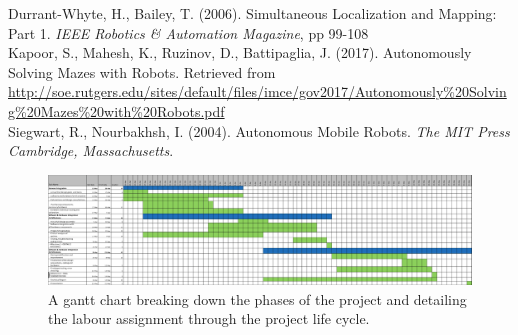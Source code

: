 \documentclass[a4paper]{article}
\begin{document}
Durrant-Whyte, H., Bailey, T. (2006). Simultaneous Localization and Mapping: Part 1. \textit{IEEE Robotics \& Automation Magazine}, pp 99-108\\

Kapoor, S., Mahesh, K., Ruzinov, D., Battipaglia, J. (2017). Autonomously Solving Mazes with Robots. Retrieved from \small\url{http://soe.rutgers.edu/sites/default/files/imce/gov2017/Autonomously%20Solving%20Mazes%20with%20Robots.pdf}\\

Siegwart, R., Nourbakhsh, I. (2004). Autonomous Mobile Robots. \textit{The MIT Press Cambridge, Massachusetts}.\\


\begin{figure}
\centering
\includegraphics[scale=0.38]{gantt_chart}
\caption{A gantt chart breaking down the phases of the project and detailing the labour assignment through the project life cycle.}
\end{figure}
\end{document}
